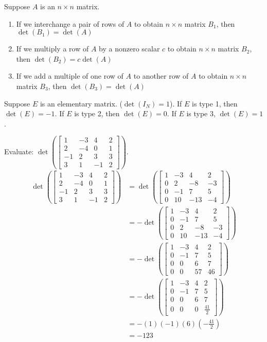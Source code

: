 \documentclass[12pt]{article}
\begin{document}
  Suppose $A$ is an $n \times n$ matrix. \begin{enumerate} 
  \item If we interchange a pair of rows of $A$ to obtain $n \times n$ matrix $B_1$, then $\det(B_1) = \det(A)$
  \item If we multiply a row of $A$ by a nonzero scalar $c$ to obtain $n \times n$ matrix $B_2$, then $\det(B_2) = c\det(A)$ \item If we add a multiple of one row of $A$ to another row of $A$ to obtain $n \times n$ matrix $B_3$, then $\det(B_3) = \det(A)$ \end{enumerate} 
  Suppose $E$ is an elementary matrix. ($\det(I_N) = 1$). If $E$ is type 1, then $\det(E) = -1$. If $E$ is type 2, then $\det(E) = 0$. If $E$ is type 3, $\det(E) = 1$. 
  \begin{example} Evaluate: $\det(\begin{bmatrix} 1 & -3 & 4 & 2 \\ 2 & -4 & 0 & 1 \\ -1 & 2 & 3 & 3 \\ 3 & 1 & -1 & 2 \end{bmatrix})$. $$\begin{aligned} \det(\begin{bmatrix} 1 & -3 & 4 & 2 \\ 2 & -4 & 0 & 1 \\ -1 & 2 & 3 & 3 \\ 3 & 1 & -1 & 2 \end{bmatrix}) &= \det(\begin{bmatrix} 1 & -3 & 4 & 2 \\ 0 & 2 & -8 & -3 \\ 0 & -1 & 7 & 5 \\ 0 & 10 & -13 & -4 \end{bmatrix}) \\ &= -\det(\begin{bmatrix} 1 & -3 & 4 & 2 \\ 0 & -1 & 7 & 5 \\ 0 & 2 & -8 & -3 \\ 0 & 10 & -13 & -4 \end{bmatrix}) \\ &= -\det(\begin{bmatrix} 1 & -3 & 4 & 2 \\ 0 & -1 & 7 & 5 \\ 0 & 0 & 6 & 7 \\ 0 & 0 & 57 & 46 \end{bmatrix})  \\ &= -\det(\begin{bmatrix} 1 & -3 & 4 & 2 \\ 0 & -1 & 7 & 5 \\ 0 & 0 & 6 & 7 \\ 0 & 0 & 0 & \frac{41}{2} \end{bmatrix}) \\ &= -(1)(-1)(6)(-\frac{41}{2}) \\ &= -123 \end{aligned} $$ \end{example} 
\end{document}
